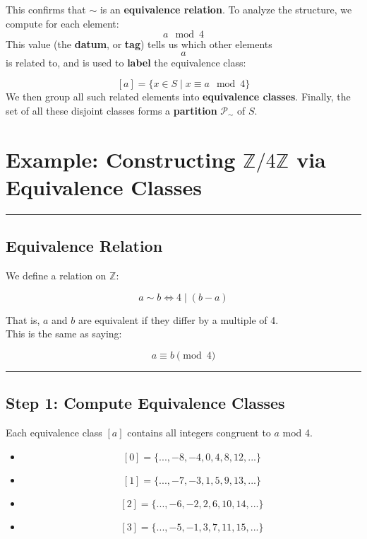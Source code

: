 \documentclass[]{article}
\providecommand{\tightlist}{%
  \setlength{\itemsep}{0pt}\setlength{\parskip}{0pt}}
\begin{document}
This confirms that \(\sim\) is an \textbf{equivalence relation}. To
analyze the structure, we compute for each element: \[
a \mod 4
\] This value (the \textbf{datum}, or \textbf{tag}) tells us which other
elements \[a\]is related to, and is used to \textbf{label} the
equivalence class:

\[
[a] = \{ x \in S \mid x \equiv a \mod 4 \}
\] We then group all such related elements into \textbf{equivalence
classes}. Finally, the set of all these disjoint classes forms a
\textbf{partition} \(\mathcal{P}_\sim\) of \(S\).

\section{\texorpdfstring{Example: Constructing
\(\mathbb{Z}/4\mathbb{Z}\) via Equivalence
Classes}{Example: Constructing \textbackslash mathbb\{Z\}/4\textbackslash mathbb\{Z\} via Equivalence Classes}}\label{example-constructing-mathbbz4mathbbz-via-equivalence-classes}

\begin{center}\rule{0.5\linewidth}{0.5pt}\end{center}

\subsection{Equivalence Relation}\label{equivalence-relation}

We define a relation on \(\mathbb{Z}\):

\[
a \sim b \iff 4 \mid (b - a)
\]

That is, \(a\) and \(b\) are equivalent if they differ by a multiple of
4.\\
This is the same as saying:

\[
a \equiv b \pmod{4}
\]

\begin{center}\rule{0.5\linewidth}{0.5pt}\end{center}

\subsection{Step 1: Compute Equivalence
Classes}\label{step-1-compute-equivalence-classes}

Each equivalence class \([a]\) contains all integers congruent to \(a\)
mod 4.

\begin{itemize}
\tightlist
\item
  \[ [0] = \{ ..., -8, -4, 0, 4, 8, 12, ... \} \]
\item
  \[ [1] = \{ ..., -7, -3, 1, 5, 9, 13, ... \} \]
\item
  \[ [2] = \{ ..., -6, -2, 2, 6, 10, 14, ... \} \]
\item
  \[ [3] = \{ ..., -5, -1, 3, 7, 11, 15, ... \} \]
\end{itemize}
\end{document}
